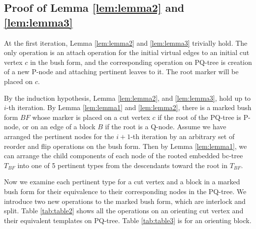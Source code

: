\documentclass[a4]{jgaa-art}
\begin{document}
\begin{appendices}
\begin{table}[h]
\end{table}

\section{Proof of Lemma \ref{lem:lemma2} and \ref{lem:lemma3}}\label{App:AppendixC}


   At the first iteration, Lemma \ref{lem:lemma2} and \ref{lem:lemma3} trivially hold.
The only operation is an attach operation
   for the initial virtual edges to an initial cut vertex $c$ in the bush form,
   and the corresponding operation on PQ-tree is creation of a new P-node and attaching pertinent
   leaves to it. The root marker will be placed on $c$.

   By the induction hypothesis,  Lemma \ref{lem:lemma2},  and \ref{lem:lemma3},  hold up to $i$-th iteration.
   By Lemma \ref{lem:lemma1} and \ref{lem:lemma2},
   there is a marked bush form $BF$ whose marker is placed on a cut vertex $c$ if
   the root of the PQ-tree is P-node, or on an edge of a block $B$ if the root is a Q-node.
   Assume we have arranged the pertinent nodes for the $i+1$-th iteration by an arbitrary set
   of reorder and flip operations on the bush form.
   Then by Lemma \ref{lem:lemma1}, 
   we can arrange the child components of each node of the rooted embedded bc-tree $T_{BF}$
   into one of 5 pertinent types from the descendants toward the root in $T_{BF}$.

   Now we examine each pertinent type for a cut vertex and a block in a marked bush form
   for their equivalence to their
   corresponding nodes in the PQ-tree. We introduce two new operations to the marked bush form, which
   are interlock and split.
   Table \ref{tab:table2} shows all the operations on an orienting cut vertex 
   and their equivalent templates on PQ-tree.
   Table \ref{tab:table3} is for an orienting block.


\end{appendices}
\end{document}

